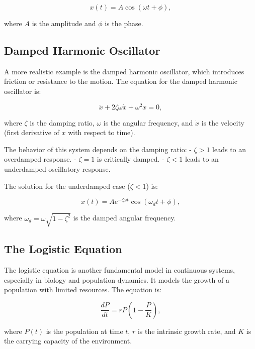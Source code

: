 \documentclass{amsbook}
\begin{document}
\begin{equation}
    x(t) = A \cos(\omega t + \phi),
\end{equation}

where \(A\) is the amplitude and \(\phi\) is the phase.

\subsection{Damped Harmonic Oscillator}

A more realistic example is the damped harmonic oscillator, which introduces friction or resistance to the motion. The equation for the damped harmonic oscillator is:

\begin{equation}
    \ddot{x} + 2\zeta \omega \dot{x} + \omega^2 x = 0,
\end{equation}

where \(\zeta\) is the damping ratio, \(\omega\) is the angular frequency, and \(\dot{x}\) is the velocity (first derivative of \(x\) with respect to time).

The behavior of this system depends on the damping ratio:
- \(\zeta > 1\) leads to an overdamped response.
- \(\zeta = 1\) is critically damped.
- \(\zeta < 1\) leads to an underdamped oscillatory response.

The solution for the underdamped case (\(\zeta < 1\)) is:

\begin{equation}
    x(t) = A e^{-\zeta \omega t} \cos(\omega_d t + \phi),
\end{equation}

where \(\omega_d = \omega \sqrt{1 - \zeta^2}\) is the damped angular frequency.

\subsection{The Logistic Equation}

The logistic equation is another fundamental model in continuous systems, especially in biology and population dynamics. It models the growth of a population with limited resources. The equation is:

\begin{equation}
    \frac{dP}{dt} = rP \left(1 - \frac{P}{K}\right),
\end{equation}

where \(P(t)\) is the population at time \(t\), \(r\) is the intrinsic growth rate, and \(K\) is the carrying capacity of the environment.
\end{document}
